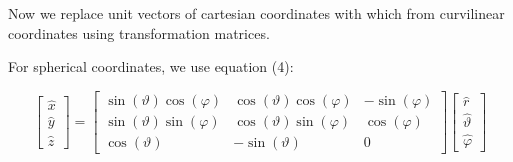 \documentclass[11pt,a4paper]{article}
\begin{document}
\begin{enumerate}
Now we replace unit vectors of cartesian coordinates with which from curvilinear coordinates using transformation matrices.

For spherical coordinates, we use equation (4):

\begin{equation*}
\begin{bmatrix}
\hat{x} \\
\hat{y} \\
\hat{z}
\end{bmatrix}
=
\begin{bmatrix}
\sin(\vartheta)\cos(\varphi) & \cos(\vartheta)\cos(\varphi) & -\sin(\varphi) \\
\sin(\vartheta)\sin(\varphi) & \cos(\vartheta)\sin(\varphi) & \cos(\varphi) \\
\cos(\vartheta) & -\sin(\vartheta) & 0
\end{bmatrix}
\begin{bmatrix}
\hat{r} \\
\hat{\vartheta} \\
\hat{\varphi}
\end{bmatrix}
\end{equation*}


\end{enumerate}
\end{document}
